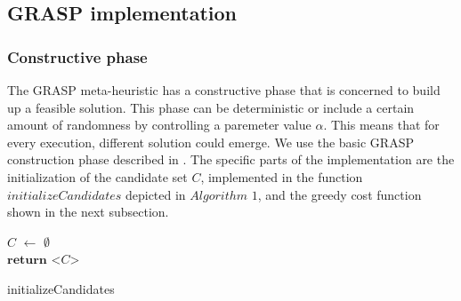 \subsection{GRASP implementation}

\subsubsection{Constructive phase}

The GRASP meta-heuristic has a constructive phase that is concerned to build up a feasible solution. This phase can be deterministic or include a certain amount of randomness by controlling a paremeter value $\alpha$.  This means
that for every execution, different solution could emerge. We use the basic GRASP construction phase described in \cite{grasp}. The specific parts of the implementation are the initialization of the candidate set $C$, implemented in the function $initializeCandidates$ depicted in $Algorithm$ $1$, and the greedy cost function shown in the next subsection.

\begin{algorithm}[H]


$C$ $\leftarrow$ $\emptyset$ \\
$\textbf{return}$ <$C$>
\caption{initializeCandidates}\label{alg.mainLoop}
\end{algorithm}


